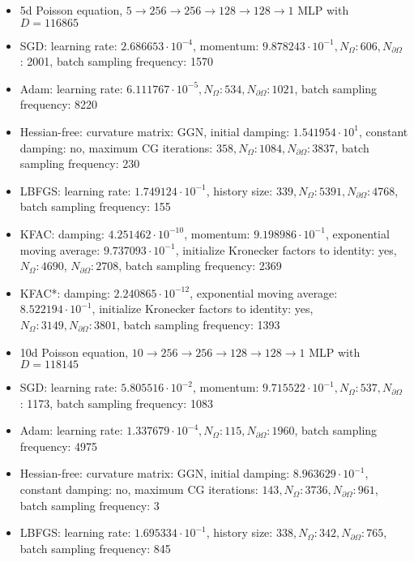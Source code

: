 \documentclass[10pt]{article}
\begin{document}
\begin{itemize}
  \item 5d Poisson equation, $5 \rightarrow 256 \rightarrow 256 \rightarrow 128 \rightarrow 128 \rightarrow 1$ MLP with $D=116865$
  \item SGD: learning rate: $2.686653 \cdot 10^{-4}$, momentum: $9.878243 \cdot 10^{-1}, N_{\Omega}: 606, N_{\partial \Omega}$ : 2001, batch sampling frequency: 1570
  \item Adam: learning rate: $6.111767 \cdot 10^{-5}, N_{\Omega}: 534, N_{\partial \Omega}: 1021$, batch sampling frequency: 8220
  \item Hessian-free: curvature matrix: GGN, initial damping: $1.541954 \cdot 10^{1}$, constant damping: no, maximum CG iterations: $358, N_{\Omega}: 1084, N_{\partial \Omega}: 3837$, batch sampling frequency: 230
  \item LBFGS: learning rate: $1.749124 \cdot 10^{-1}$, history size: $339, N_{\Omega}: 5391, N_{\partial \Omega}: 4768$, batch sampling frequency: 155
  \item KFAC: damping: $4.251462 \cdot 10^{-10}$, momentum: $9.198986 \cdot 10^{-1}$, exponential moving average: $9.737093 \cdot 10^{-1}$, initialize Kronecker factors to identity: yes, $N_{\Omega}: 4690$, $N_{\partial \Omega}: 2708$, batch sampling frequency: 2369
  \item KFAC*: damping: $2.240865 \cdot 10^{-12}$, exponential moving average: $8.522194 \cdot 10^{-1}$, initialize Kronecker factors to identity: yes, $N_{\Omega}: 3149, N_{\partial \Omega}: 3801$, batch sampling frequency: 1393
  \item 10d Poisson equation, $10 \rightarrow 256 \rightarrow 256 \rightarrow 128 \rightarrow 128 \rightarrow 1$ MLP with $D=118145$
  \item SGD: learning rate: $5.805516 \cdot 10^{-2}$, momentum: $9.715522 \cdot 10^{-1}, N_{\Omega}: 537, N_{\partial \Omega}$ : 1173, batch sampling frequency: 1083
  \item Adam: learning rate: $1.337679 \cdot 10^{-4}, N_{\Omega}: 115, N_{\partial \Omega}: 1960$, batch sampling frequency: 4975
  \item Hessian-free: curvature matrix: GGN, initial damping: $8.963629 \cdot 10^{-1}$, constant damping: no, maximum CG iterations: $143, N_{\Omega}: 3736, N_{\partial \Omega}: 961$, batch sampling frequency: 3
  \item LBFGS: learning rate: $1.695334 \cdot 10^{-1}$, history size: $338, N_{\Omega}: 342, N_{\partial \Omega}: 765$, batch sampling frequency: 845

\end{itemize}
\end{document}
